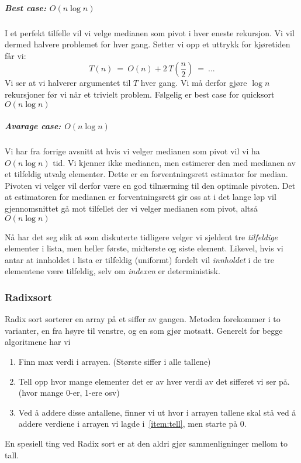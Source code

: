 \subparagraph{Best case: $ O(n\log n) $}
I et perfekt tilfelle vil vi velge medianen som pivot i hver eneste rekursjon. Vi vil dermed halvere problemet for hver gang. Setter vi opp et uttrykk for kjøretiden får vi:
\[ T(n) ~=~ O(n) + 2\,T\left( \frac{n}{2} \right) ~=~ ... \]
Vi ser at vi halverer argumentet til $ T $ hver gang. Vi må derfor gjøre $ \log n $ rekursjoner før vi når et trivielt problem. Følgelig er best case for quicksort $ O(n\log n) $

\subparagraph{Avarage case: $ O(n\log n) $}
Vi har fra forrige avsnitt at hvis vi velger medianen som pivot vil vi ha $ O(n\log n) $ tid.  Vi kjenner ikke medianen, men estimerer den med medianen av et tilfeldig utvalg elementer. Dette er en forventningsrett estimator for median. Pivoten vi velger vil derfor være en god tilnærming til den optimale pivoten. Det at estimatoren for medianen er forventningsrett gir oss at i det lange løp vil gjennomsnittet gå mot tilfellet der vi velger medianen som pivot, altså $ O(n\log n) $

Nå har det seg slik at som diskuterte tidligere velger vi sjeldent tre \emph{tilfeldige} elementer i lista, men heller første, midterste og siste element. Likevel, hvis vi antar at innholdet i lista er tilfeldig (uniformt) fordelt vil \emph{innholdet} i de tre elementene være tilfeldig, selv om \emph{indexen} er deterministisk.



\subsubsection{Radixsort}\label{radixsort}
Radix sort sorterer en array på et siffer av gangen.
Metoden forekommer i to varianter, en fra høyre til venstre, og en som gjør
motsatt. Generelt for begge algoritmene har vi
\begin{enumerate}
\item Finn max verdi i arrayen. (Største siffer i alle tallene)
\item\label{item:tell} Tell opp hvor mange elementer det er av hver verdi av det sifferet vi ser
  på. (hvor mange 0-er, 1-ere osv)
\item Ved å addere disse antallene, finner vi ut hvor i arrayen tallene skal stå
  ved å addere verdiene i arrayen vi lagde i~\ref{item:tell}, men starte på 0.
\end{enumerate}
En spesiell ting ved Radix sort er at den aldri gjør sammenligninger mellom to
tall.

